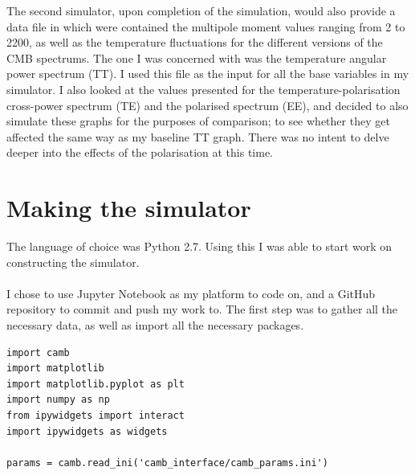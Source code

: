 \documentclass[twoside, fontsize=12pt,
     bibliography=totoc, %
     listof=totoc, %
     index=totoc, %
     onehalfspacing %
]{_MScDiss2017_cls}
\begin{document}
The second simulator, upon completion of the simulation, would also provide a data file in which were contained the multipole moment values ranging from 2 to 2200, as well as the temperature fluctuations for the different versions of the CMB spectrums. The one I was concerned with was the temperature angular power spectrum (TT). I used this file as the input for all the base variables in my simulator. I also looked at the values presented  for the temperature-polarisation cross-power spectrum (TE) and the polarised spectrum (EE), and decided to also simulate these graphs for the purposes of comparison; to see whether they get affected the same way as my baseline TT graph. There was no intent to delve deeper into the effects of the polarisation at this time.

\section{Making the simulator}

The language of choice was Python 2.7. Using this I was able to start work on constructing the simulator.

\paragraph{}

I chose to use Jupyter Notebook \cite{JupyterNotebook} as my platform to code on, and a GitHub repository \cite{Github} to commit and push my work to. The first step was to gather all the necessary data, as well as import all the necessary packages. 

\begin{lstfloat}
\begin{lstlisting}[caption={Setting up}, captionpos=b]
import camb
import matplotlib
import matplotlib.pyplot as plt
import numpy as np
from ipywidgets import interact
import ipywidgets as widgets

params = camb.read_ini('camb_interface/camb_params.ini')
\end{lstlisting}
\end{lstfloat}
\end{document}
